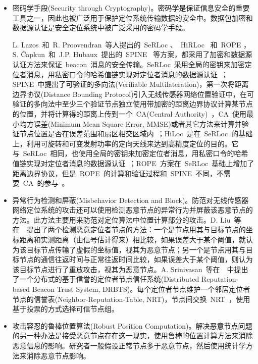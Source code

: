 \documentclass[a4paper,10pt]{article}
\begin{document}
\begin{itemize}

\item 密码学手段(Security through Cryptography)。密码学是保证信息安全的重要工具之一，因此也被广泛用于保护定位系统传输数据的安全中。数据包加密和数据源认证是安全定位系统中被广泛采用的密码学手段。

L. Lazos~和~R. Proovendran~等人提出的~SeRLoc \cite{Lazos2005}、~HiRLoc \cite{Lazos2005a}~和~ROPE \cite{Lazos2006}，S. \v{C}apkun~和~J.P. Hubaux~提出的~SPINE \cite{Capkun2006}~等方案，都采用了加密和数据源认证方法来保证~beacon~消息的安全传输。SeRLoc~采用全局的密钥来加密定位者消息，用私密口令的哈希值链实现对定位者消息的数据源认证~\cite{Lazos2005}；SPINE~中提出了可验证的多向法(Verifiable Multilateration)，第一次将距离边界协议(Distance Bounding Protocol)引入无线传感器网络位置验证中，在可验证的多向法中至少三个验证节点独立使用带加密的距离边界协议计算某节点的位置，并将计算得的距离上传到一个~CA(Central Authority)~，CA~使用最小均方误差(Minimum Mean Square Error, MMSE)或者其它方法来计算并验证节点位置是否在误差范围和扇区相交区域内~\cite{Capkun2006}；HiLoc~是在~SeRLoc~的基础上，利用可旋转和可变发射功率的定向天线来达到高精度定位的目的。它与~SeRLoc~相同，也使用全局的密钥来加密定位者消息，用私密口令的哈希值链实现对定位者消息的数据源认证~\cite{Lazos2005a}；ROPE~方案在~SeRLoc~基础上增加了距离边界协议，但是~ROPE~的计算和验证过程和~SPINE~不同，不需要~CA~的参与~\cite{Lazos2006}。

\item 异常行为检测和屏蔽(Misbehavior Detection and Block)。防范对无线传感器网络定位系统的攻击还可以使用检测恶意节点的异常行为并屏蔽该恶意节点的方法。此方法主要用来防范对定位算法中位置计算部分的攻击。D. Liu~等在~\cite{Liu2005c}~提出了两个检测恶意定位者节点的方法：一个是节点用其与目标节点的坐标距离和实测距离（由信号估计得来）相比较，如果误差大于某个阈值，就认为该目标节点传输了虚假的坐标值，视其为恶意节点；另一个是节点用其与目标节点的通信往返时间与正常往返时间比较，如果误差大于某个阈值，则认为该目标节点进行了重放攻击，视其为恶意节点。A. Srinivasan~等在~\cite{Srinivasan2006}~中提出了一个分布式的基于信誉的定位者节点信任系统(Distributed Reputation-based Beacon Trust System, DRBTS)。每个定位者节点维护一个邻居定位者节点的信誉表(Neighbor-Reputation-Table, NRT)，节点间交换~NRT~，使用基于投票的方式选择可信节点组。

\item 攻击容忍的鲁棒位置算法(Robust Position Computation)。解决恶意节点问题的另一种办法是接受恶意节点存在这一现实，使用鲁棒的位置计算方法来消除恶意信息的影响。研究者一般假设正常节点多于恶意节点，然后使用统计学方法来消除恶意节点影响。


\end{itemize}
\end{document}
